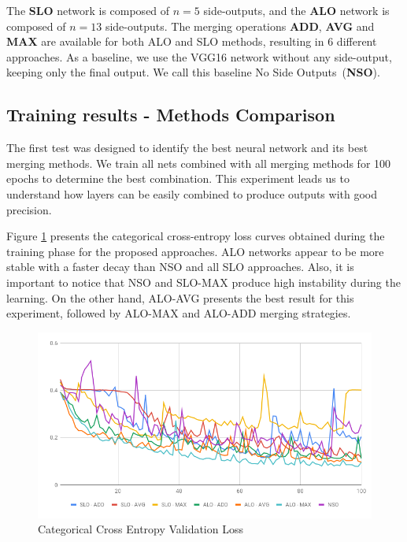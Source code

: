The \textbf{SLO} network is composed of $n=5$ side-outputs, and the \textbf{ALO} network is composed of $n=13$ side-outputs. 
The merging operations \textbf{ADD}, \textbf{AVG} and \textbf{MAX} are available for both ALO and SLO methods, resulting in 6 different approaches.
As a baseline, we use the VGG16 network without any side-output, keeping only the final output. We call this baseline No Side Outputs~(\textbf{NSO}).

\subsection{Training results - Methods Comparison}

The first test was designed to identify the best neural network and its best merging methods. We train all nets combined with all merging methods for 100 epochs to determine the best combination. This experiment leads us to understand how layers can be easily combined to produce outputs with good precision.

Figure \ref{fig:validation_loss} presents the categorical cross-entropy loss curves obtained during the training phase for the proposed approaches. ALO networks appear to be more stable with a faster decay than NSO and all SLO approaches. Also, it is important to notice that NSO and SLO-MAX produce high instability during the learning. On the other hand, ALO-AVG presents the best result for this experiment, followed by ALO-MAX and ALO-ADD merging strategies.

\begin{figure}
  \centering
    \includegraphics[width=1.\columnwidth]{figures/falreis/validation_loss.png}
  \caption{Categorical Cross Entropy Validation Loss}
  \label{fig:validation_loss}
\end{figure}

